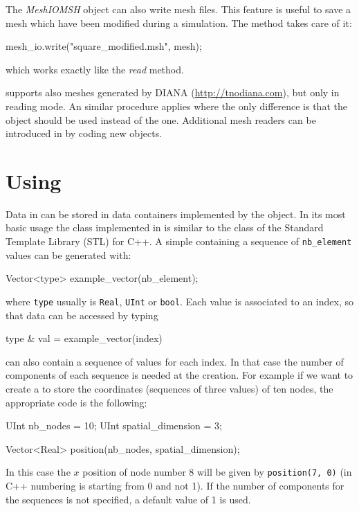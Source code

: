 The \textit{MeshIOMSH} object can also write mesh files. This
feature is useful to save a mesh which have been modified during a
simulation. The  method takes care of it:
\begin{cpp}
  mesh_io.write("square_modified.msh", mesh);
\end{cpp}
which works exactly like the \textit{read} method.

\akantu supports also meshes generated by
DIANA (\url{http://tnodiana.com}), but only in reading mode. An similar
procedure applies where the only
difference is that the  object should be used
instead of the  one. Additional mesh readers can be
introduced in \akantu by coding new  objects.

\section{Using }

Data in \akantu can be stored in data containers implemented by
the  object. In its most basic usage the  class
implemented in \akantu is similar to the  class of
the Standard Template Library (STL) for C++. A simple 
containing a sequence of \texttt{nb\_element} values can be generated with:
\begin{cpp}
  Vector<type> example_vector(nb_element);
\end{cpp}
where \texttt{type} usually is \texttt{Real}, \texttt{UInt} or
\texttt{bool}. Each value is associated to an index, so that data can be
accessed by typing

\begin{cpp}
  type & val = example_vector(index)
\end{cpp}

 can also contain a
sequence of values for each index. In that case the number of components 
of each sequence is needed at the  creation. 
For example if we want to create a  to store
the coordinates (sequences of three values) of ten nodes, the appropriate 
code is the following:
\begin{cpp}
  UInt nb_nodes = 10;
  UInt spatial_dimension = 3;

  Vector<Real> position(nb_nodes, spatial_dimension);
\end{cpp}
In this case the $x$ position of node number 8 will be given by
\texttt{position(7, 0)} (in C++ numbering is starting from 0 and not
1). If the number of components for the sequences is not specified, a
default value of 1 is used. 

